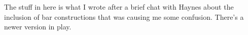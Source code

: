 \documentclass[10pt]{article}
\newcommand{\PRLie}[1]%
{\ifblank{#1}{\scrR}{\scrR^{#1}}}
\newcommand{\LL}[1]{\ifblank{#1}{\scrK}{\scrK^{#1}}}
\newcommand{\GR}[1]{\ifblank{#1}{\scrV}{\scrV^{#1}}}
\newcommand{\nontop}[1]{\ifblank{#1}{\scrU}{\scrU^{#1}}}
\newcommand{\Boverline}{\smash{\overline{B}}\rule{0mm}{\heightof{\ensuremath{B}}}}
\newcommand{\Ind}[2][]{\ifblank{#1}{\mathbf{I}^{\smash{\mbox{\tiny $#2$}}}}{\mathbf{I}^{\mbox{\tiny $#2$}}_{#1}}}%
\newcommand{\forgetSymbol}{\mathrm{fg}}
\newcommand{\forget}[1]{\mathrm{fg}_{\smash{\mbox{\tiny $#1$}}}}
\newcommand{\Fr}[2][]{\ifblank{#1}{#2}{#2_{#1}}}
\newcommand{\derived}{\mathbb{L}}
\begin{document}
\begin{ConvHRM_InclusionOfBarConstructions}
The stuff in here is what I wrote after a brief chat with Haynes about the inclusion of bar constructions that was causing me some confusion. There's a newer version in play.
%

\end{ConvHRM_InclusionOfBarConstructions}
\end{document}
